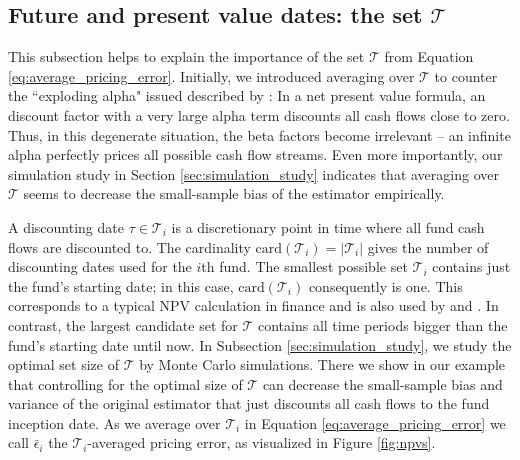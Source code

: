 \documentclass[12pt]{article}
\begin{document}
\subsection{Future and present value dates: the set $\mathcal{T}$}
\label{subsec:npv_vs_fv}

This subsection helps to explain the importance of the set $\mathcal{T}$ from Equation \ref{eq:average_pricing_error}.
Initially, we introduced averaging over $\mathcal{T}$ to counter the ``exploding alpha" issued described by \cite{DLP12}: 
In a net present value formula, an discount factor with a very large alpha term discounts all cash flows close to zero.
Thus, in this degenerate situation, the beta factors become irrelevant -- an infinite alpha perfectly prices all possible cash flow streams.
Even more importantly, our simulation study in Section \ref{sec:simulation_study} indicates that averaging over $\mathcal{T}$ seems to decrease the small-sample bias of the estimator empirically.

A discounting date $\tau \in \mathcal{T}_{i}$ is a discretionary point in time where all fund cash flows are discounted to.
The cardinality $\mathrm{card}(\mathcal{T}_{i}) = \left| \mathcal{T}_{i} \right|$ gives the number of discounting dates used for the $i$th fund.
The smallest possible set $\mathcal{T}_i$ contains just the fund's starting date; in this case, $\mathrm{card}(\mathcal{T}_{i})$ consequently is one.
This corresponds to a typical NPV calculation in finance and is also used by \cite{DLP12} and \cite{KN16}.
In contrast, the largest candidate set for $\mathcal{T}$ contains all time periods bigger than the fund's starting date until now.
In Subsection \ref{sec:simulation_study}, we study the optimal set size of $\mathcal{T}$ by Monte Carlo simulations.
There we show in our example that controlling for the optimal size of $\mathcal{T}$ can decrease the small-sample bias and variance of the original \cite{DLP12} estimator that just discounts all cash flows to the fund inception date.
As we average over $\mathcal{T}_i$ in Equation \ref{eq:average_pricing_error} we call $\bar{\epsilon}_{i}$ the $\mathcal{T}_i$-averaged pricing error, as visualized in Figure \ref{fig:npvs}.
\end{document}
